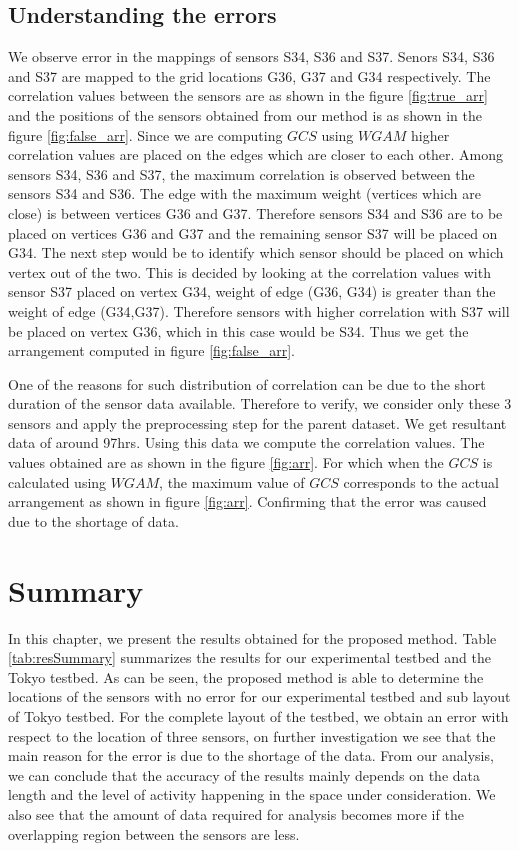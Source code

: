 \subsection{Understanding the errors}
We observe error in the mappings of sensors S34, S36 and S37. Senors S34, S36 and S37 are mapped to the grid locations G36, G37 and G34 respectively. The correlation values between the sensors are as shown in the figure \ref{fig:true_arr} and the positions of the sensors obtained from our method is as shown in the figure \ref{fig:false_arr}. Since we are computing $GCS$ using $WGAM$ higher correlation values are placed on the edges which are closer to each other. Among sensors S34, S36 and S37, the maximum correlation is observed between the sensors S34 and S36. The edge with the maximum weight (vertices which are close) is between vertices G36 and G37. Therefore sensors S34 and S36 are to be placed on vertices G36 and G37 and the remaining sensor S37 will be placed on G34. The next step would be to identify which sensor should be placed on which vertex out of the two. This is decided by looking at the correlation values with sensor S37 placed on vertex G34, weight of edge (G36, G34) is greater than the weight of edge (G34,G37). Therefore sensors with higher correlation with S37 will be placed on vertex G36, which in this case would be S34. Thus we get the arrangement computed in figure \ref{fig:false_arr}.


One of the reasons for such distribution of correlation can be due to the short duration of the sensor data available. Therefore to verify, we consider only these 3 sensors and apply the preprocessing step for the parent dataset. We get resultant data of around 97hrs. Using this data we compute the correlation values. The values obtained are as shown in the figure \ref{fig:arr}. For which when the $GCS$ is calculated using $WGAM$, the maximum value of $GCS$ corresponds to the actual arrangement as shown in figure \ref{fig:arr}. Confirming that the error was caused due to the shortage of data.


\section{Summary}

In this chapter, we present the results obtained for the proposed method. Table \ref{tab:resSummary} summarizes the results for our experimental testbed and the Tokyo testbed. As can be seen, the proposed method is able to determine the locations of the sensors with no error for our experimental testbed and sub layout of Tokyo testbed. For the complete layout of the testbed, we obtain an error with respect to the location of three sensors, on further investigation we see that the main reason for the error is due to the shortage of the data. From our analysis, we can conclude that the accuracy of the results mainly depends on the data length and the level of activity happening in the space under consideration. We also see that the amount of data required for analysis becomes more if the overlapping region between the sensors are less.


